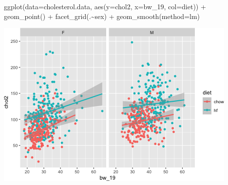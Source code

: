 \documentclass[
]{article}
\newenvironment{Shaded}{\begin{snugshade}}{\end{snugshade}}
\newcommand{\AttributeTok}[1]{\textcolor[rgb]{0.77,0.63,0.00}{#1}}
\newcommand{\FunctionTok}[1]{\textcolor[rgb]{0.00,0.00,0.00}{#1}}
\newcommand{\NormalTok}[1]{#1}
\newcommand{\SpecialCharTok}[1]{\textcolor[rgb]{0.00,0.00,0.00}{#1}}
\begin{document}
\begin{Shaded}
\begin{Highlighting}[]
\FunctionTok{ggplot}\NormalTok{(}\AttributeTok{data=}\NormalTok{cholesterol.data,}
       \FunctionTok{aes}\NormalTok{(}\AttributeTok{y=}\NormalTok{chol2,}
           \AttributeTok{x=}\NormalTok{bw\_19,}
           \AttributeTok{col=}\NormalTok{diet)) }\SpecialCharTok{+}
  \FunctionTok{geom\_point}\NormalTok{() }\SpecialCharTok{+}
  \FunctionTok{facet\_grid}\NormalTok{(.}\SpecialCharTok{\textasciitilde{}}\NormalTok{sex) }\SpecialCharTok{+}
  \FunctionTok{geom\_smooth}\NormalTok{(}\AttributeTok{method=}\NormalTok{lm)}
\end{Highlighting}
\end{Shaded}

\includegraphics{figures/BW_19-1.png}
\end{document}
